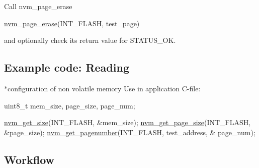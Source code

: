 \begin{DoxyEnumerate}
\item Call nvm\-\_\-page\-\_\-erase 
\begin{DoxyCode}
 \hyperlink{xmega__nvm_8c_a647ad906f2c90020d68084b0d3c7c206}{nvm\_page\_erase}(INT\_FLASH, test\_page) 
\end{DoxyCode}
 and optionally check its return value for S\-T\-A\-T\-U\-S\-\_\-\-O\-K.
\end{DoxyEnumerate}\hypertarget{common_nvm_quickstart_nvm_basic_use_case_usage_code_config}{}\subsection{Example code\-: Reading}\label{common_nvm_quickstart_nvm_basic_use_case_usage_code_config}
$\ast$configuration of non volatile memory Use in application C-\/file\-: 
\begin{DoxyCode}
           uint8\_t mem\_size, page\_size, page\_num;

           \hyperlink{xmega__nvm_8c_ad90ba5cf40374577ef525365bbc86641}{nvm\_get\_size}(INT\_FLASH, &mem\_size);
           \hyperlink{xmega__nvm_8c_a784427385b7243e8d69dcb52933116d8}{nvm\_get\_page\_size}(INT\_FLASH, &page\_size);
           \hyperlink{xmega__nvm_8c_ae88b4f69e71b6c7991d2e222ec7f4bc6}{nvm\_get\_pagenumber}(INT\_FLASH, test\_address, &
      page\_num);
\end{DoxyCode}
\hypertarget{common_nvm_quickstart_nvm_basic_use_case_usage_flow}{}\subsection{Workflow}\label{common_nvm_quickstart_nvm_basic_use_case_usage_flow}

